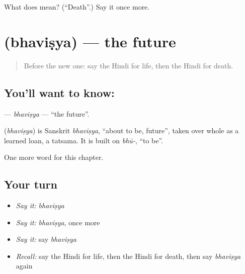 \begin{tcolorbox}[breakable,colback=teal!4,colframe=teal!35!black,title={Before you move on}]
What does  mean? (\textquotedblleft{}Death\textquotedblright{}.) Say it once more.
\end{tcolorbox}
\section[\texorpdfstring{\hi{भविष्य} (bhaviṣya)}{भविष्य (bhaviṣya)}]{ (bhaviṣya) — the future}

\label{lesson:HI-C221-bhavisya}



\begin{quote}
Before the new one: say the Hindi for life, then the Hindi for death.
\end{quote}

\subsection*{You'll want to know: }
\textbf{} — \emph{bhaviṣya} — \textquotedblleft{}the future\textquotedblright{}.

\begin{cousinweb}
\textbf{} (\emph{bhaviṣya}) is Sanskrit \emph{bhaviṣya}, \textquotedblleft{}about to be, future\textquotedblright{}, taken over whole as a learned loan, a tatsama. It is built on \emph{bhū-}, \textquotedblleft{}to be\textquotedblright{}.
\end{cousinweb}

\begin{grammarlens}[title={What you've built}]
One more word for this chapter.
\end{grammarlens}

\subsection*{Your turn}
\begin{itemize}
\raggedright
  \item \emph{Say it:} \emph{bhaviṣya}
  \item \emph{Say it:} \emph{bhaviṣya}, once more
  \item \emph{Say it:} say \emph{bhaviṣya}
  \item \emph{Recall:} say the Hindi for life, then the Hindi for death, then say \emph{bhaviṣya} again
\end{itemize}

